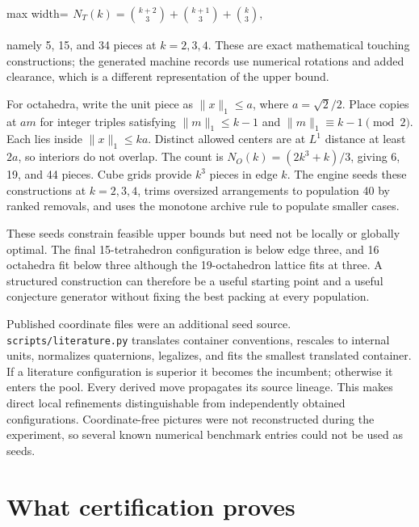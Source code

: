 \documentclass[11pt,a4paper]{article}
\begin{document}
\begin{center}\begin{adjustbox}{max width=\linewidth}$\displaystyle\begin{aligned}
N_T(k)=\binom{k+2}{3}+\binom{k+1}{3}+\binom{k}{3},
\end{aligned}$\end{adjustbox}\end{center}

namely 5, 15, and 34 pieces at \(k=2,3,4\). These are exact mathematical touching constructions; the generated machine records use numerical rotations and added clearance, which is a different representation of the upper bound.

For octahedra, write the unit piece as \(\|x\|_1\le a\), where \(a=\sqrt2/2\). Place copies at \(am\) for integer triples satisfying \(\|m\|_1\le k-1\) and \(\|m\|_1\equiv k-1\pmod2\). Each lies inside \(\|x\|_1\le ka\). Distinct allowed centers are at \(L^1\) distance at least \(2a\), so interiors do not overlap. The count is \(N_O(k)=(2k^3+k)/3\), giving 6, 19, and 44 pieces. Cube grids provide \(k^3\) pieces in edge \(k\). The engine seeds these constructions at \(k=2,3,4\), trims oversized arrangements to population 40 by ranked removals, and uses the monotone archive rule to populate smaller cases.

These seeds constrain feasible upper bounds but need not be locally or globally optimal. The final 15-tetrahedron configuration is below edge three, and 16 octahedra fit below three although the 19-octahedron lattice fits at three. A structured construction can therefore be a useful starting point and a useful conjecture generator without fixing the best packing at every population.

Published coordinate files were an additional seed source. \nolinkurl{scripts/literature.py} translates container conventions, rescales to internal units, normalizes quaternions, legalizes, and fits the smallest translated container. If a literature configuration is superior it becomes the incumbent; otherwise it enters the pool. Every derived move propagates its source lineage. This makes direct local refinements distinguishable from independently obtained configurations. Coordinate-free pictures were not reconstructed during the experiment, so several known numerical benchmark entries could not be used as seeds.

\section{What certification proves}
\end{document}
